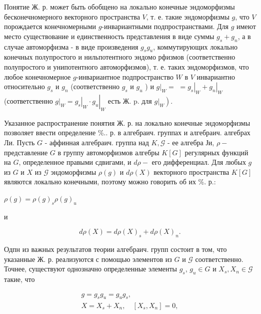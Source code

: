\documentclass[10pt]{article}
\begin{document}
Понятие Ж. р. может быть обобщено на локально конечные эндоморфизмы бесконечномерного векторного пространства $V$, т. е. такие эндоморфизмы $g$, что $V$ порождается конечномерными $g$-инвариантными подпространствами. Для $g$ имеют место существование и единственность представления в виде суммы $g_{s}+g_{n}$, а в случае автоморфизма - в виде произведения $g_{s} g_{u}$, коммутирующих локально конечных полупростого и нильпотентного эндомо рфизмов (соответственно полупростого и унипотентного автоморфизмов), т. е. таких эндоморфизмов, что любое конечномерное $g$-инвариантное подпространство $W$ в $V$ инвариантно относительно $g_{s}$ и $g_{n}$ (соответственно $g_{s}$ и $g_{u}$ ) и $\left.g\right|_{W}=$ $=\left.g_{s}\right|_{W}+\left.g_{n}\right|_{W}$ (соответственно $\left.g\right|_{W}=\left.\left.g_{s}\right|_{W} \cdot g_{u}\right|_{W}$ есть Ж. p. для $\left.\left.g\right|_{W}\right)$.



Указанное распространение понятия Ж. р. на локально конечные эндоморфизмы позволяет ввести определение \%.. р. в алгебраич. группах и алгебраич. алгебрах Ли. Пусть $G$ - аффинная алгебраич. группа над $K, \mathscr{G}$ - ее алгебра Ји, $\rho-$ представление $G$ в группу автоморфизмов алгебры $K[G]$ регулярных функций на $G$, определенное правыми сдвигами, и $d \rho-$ его дифференциал. Для любых $g$ из $G$ и $X$ из $\mathscr{G}$ эндоморфизмы $\rho(g)$ и $d \rho(X)$ векторного пространства $K[G]$ являются локально конечными, поэтому можно говорить об их \%. р.:



$\rho(g)=\rho(g)_{s} \rho(g)_{u}$



и



\[

d \rho(X)=d \rho(X)_{s}+d \rho(X)_{n} .

\]



Одпн из важных результатов теории алгебраич. групп состоит в том, что указанные Ж. р. реализуются с помощью элементов из $G$ и $\mathcal{G}$ соответственно. Точнее, существуют однозначно определенные элементы $g_{s}$, $g_{u} \in G$ и $X_{s}, X_{n} \in \mathcal{G}$ такие, что



\[

\begin{gathered}

g=g_{s} g_{u}=g_{u} g_{s}, \\

X=X_{s}+X_{n}, \quad\left[X_{s}, X_{n}\right]=0,

\end{gathered}

\]
\end{document}
